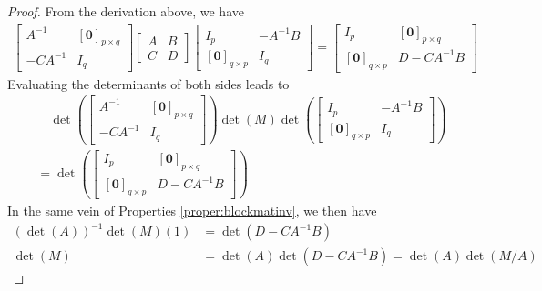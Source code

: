 \begin{proof}
From the derivation above, we have
\begin{align*}
\begin{bmatrix}
A^{-1} & [\textbf{0}]_{p\times q} \\
-CA^{-1} & I_q
\end{bmatrix}
\begin{bmatrix}
A & B \\
C & D
\end{bmatrix}
\begin{bmatrix}
I_p & -A^{-1}B \\
[\textbf{0}]_{q \times p} & I_q
\end{bmatrix} 
=
\begin{bmatrix}
I_p & [\textbf{0}]_{p \times q} \\
[\textbf{0}]_{q\times p} & D - CA^{-1}B 
\end{bmatrix}
\end{align*}
Evaluating the determinants of both sides leads to
\begin{align*}
&\quad \det(\begin{bmatrix}
A^{-1} & [\textbf{0}]_{p\times q} \\
-CA^{-1} & I_q
\end{bmatrix})
\det(M)
\det(\begin{bmatrix}
I_p & -A^{-1}B \\
[\textbf{0}]_{q \times p} & I_q
\end{bmatrix}) \\
&=
\det(\begin{bmatrix}
I_p & [\textbf{0}]_{p \times q} \\
[\textbf{0}]_{q\times p} & D - CA^{-1}B 
\end{bmatrix})
\end{align*}
In the same vein of Properties \ref{proper:blockmatinv}, we then have
\begin{align*}
(\det(A))^{-1}\det(M)(1) &= \det(D-CA^{-1}B) \\
\det(M) &= \det(A)\det(D-CA^{-1}B) = \det(A)\det(M/A)
\end{align*}
\end{proof}


